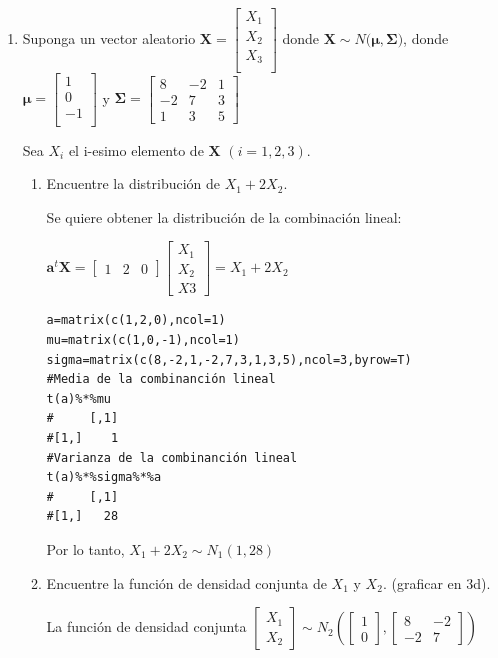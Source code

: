 \documentclass[12pt,a4paper]{report}
\begin{document}
\begin{enumerate}
\begin{enumerate}
\end{enumerate}



\item Suponga un vector aleatorio $\mathbf{X}=\begin{bmatrix} X_1 \\ X_2 \\ X_3 \\ \end{bmatrix}$ donde $\mathbf{X} \sim N(\boldsymbol{\mu}, \boldsymbol{\Sigma)}$, donde $\boldsymbol{\mu}=\begin{bmatrix} 1 \\ 0 \\ -1 \\ \end{bmatrix}$ y $\boldsymbol{\Sigma}=\begin{bmatrix} 8 & -2 & 1 \\ -2 & 7 & 3 \\ 1 & 3 & 5 \end{bmatrix}$

Sea $X_i$ el i-esimo elemento de $\mathbf{X}$ $(i = 1, 2, 3)$.

\begin{enumerate}
\item Encuentre la distribución de $X_1 + 2X_2$. 

Se quiere obtener la distribución de la combinación lineal:

$\mathbf{a}^t\mathbf{X}=\begin{bmatrix} 1 & 2 & 0 \end{bmatrix}\begin{bmatrix} X_1 \\ X_2 \\ X3 \end{bmatrix}=X_1+2X_2$

\begin{verbatim}
a=matrix(c(1,2,0),ncol=1)
mu=matrix(c(1,0,-1),ncol=1)
sigma=matrix(c(8,-2,1,-2,7,3,1,3,5),ncol=3,byrow=T)
#Media de la combinanción lineal
t(a)%*%mu
#     [,1]
#[1,]    1
#Varianza de la combinanción lineal
t(a)%*%sigma%*%a
#     [,1]
#[1,]   28
\end{verbatim}
Por lo tanto, $X_1+2X_2 \sim N_1(1,28)$

\item Encuentre la función de densidad conjunta de $X_1$ y $X_2$. (graficar en 3d). 


La función de densidad conjunta $\begin{bmatrix} X_1 \\ X_2 \end{bmatrix} \sim N_2 \left( \begin{bmatrix} 1\\ 0 \end{bmatrix},\begin{bmatrix} 8 & -2\\ -2 & 7 \end{bmatrix} \right)$


\end{enumerate}
\end{enumerate}
\end{document}
